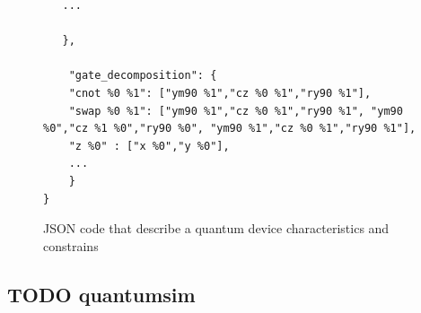 \begin{itemize}
\begin{figure}
{\begin{verbatim}
   ...

   },

    "gate_decomposition": {
	"cnot %0 %1": ["ym90 %1","cz %0 %1","ry90 %1"],
	"swap %0 %1": ["ym90 %1","cz %0 %1","ry90 %1", "ym90 %0","cz %1 %0","ry90 %0", "ym90 %1","cz %0 %1","ry90 %1"],
	"z %0" : ["x %0","y %0"],
    ...
    }
}

\end{verbatim}




}
\label{code:json_sc7_second_part}

\caption{JSON code that describe a quantum device characteristics and constrains}
\label{code:json_sc7}
\end{figure}
\end{itemize}

\subsection*{{\bfseries\sffamily TODO} quantumsim}
\label{sec:org51f59bb}

